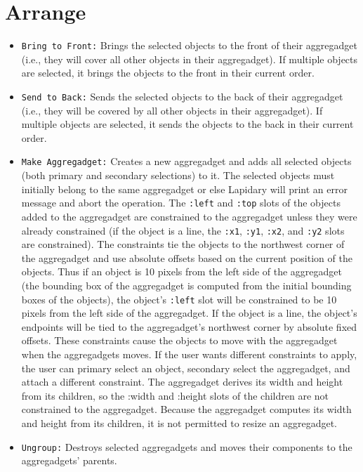 \section{Arrange}
\begin{itemize}
\item {}
{\tt Bring to Front:} Brings the selected objects to the front
of their aggregadget (i.e., they will cover all other objects in their
aggregadget).  If multiple objects are selected, it brings the objects to the
front in their current order.

\item {}
{\tt Send to Back:} Sends the selected objects to the back of their
aggregadget (i.e., they will be covered by all other objects in their
aggregadget). If multiple objects are selected, it sends the objects
to the back in their current order.

\item {}
{\tt Make Aggregadget:} Creates a new aggregadget and adds all
selected objects (both primary and secondary selections) to it.
The selected objects must initially belong to the same aggregadget or else
Lapidary will print an error message and abort the operation.
The {\tt :left} and {\tt :top} slots of the
objects added to the aggregadget are constrained to the aggregadget unless
they were already constrained (if the object is a line, the {\tt :x1}, {\tt :y1},
{\tt :x2}, and {\tt :y2} slots are constrained).
The constraints tie the objects to the northwest corner of the aggregadget
and use absolute offsets based on the current position of the objects.
Thus if an object is 10 pixels from the left side of the aggregadget (the
bounding box of the aggregadget is computed from the initial bounding
boxes of the objects), the object's {\tt :left} slot will be constrained to be 10
pixels from the left side of the aggregadget.
If the object is a line, the object's endpoints will be tied to
the aggregadget's northwest corner by absolute fixed offsets.
These constraints cause the objects to move with the aggregadget
when the aggregadgets moves.
If the user wants different constraints to apply, the user can primary
select an object, secondary select the aggregadget, and attach a different
constraint.  The aggregadget derives its width and height
from its children, so the :width and :height slots of the children are not
constrained to the aggregadget.  Because the aggregadget computes
its width and height from its children, it is not permitted to resize
an aggregadget.

\item {}
{\tt Ungroup:} Destroys selected aggregadgets and moves their components to the
aggregadgets' parents.

\end{itemize}


